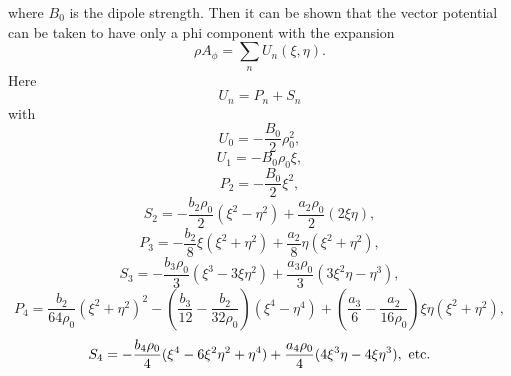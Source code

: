 \noindent where $B_0$ is the dipole strength.  Then it can be shown that the vector potential can be taken to have only a phi component with the expansion
\begin{equation}
\rho A_{\phi} = \sum_n U_n(\xi ,\eta ).
\end{equation}
Here
\begin{equation}
U_n = P_n + S_n
\end{equation}
with
\begin{equation}
U_0 = -\frac{B_0}{2} \rho^2_0,
\end{equation}
\begin{equation}
U_1 = -B_0\rho_0\xi ,
\end{equation}
\begin{equation}
P_2 = -\frac{B_0}{2} \xi^2 ,
\end{equation}
\begin{equation}
S_2 = -\frac{b_2\rho_0}{2}  (\xi^2 - \eta^2) + \frac{a_2\rho_0}{2} (2\xi \eta ),
\end{equation}
\begin{equation}
P_3 = -\frac{b_2}{8} \xi  (\xi^2 + \eta^2) + \frac{a_2}{8} \eta (\xi^2 + \eta^2),
\end{equation}
\begin{equation}
S_3 = -\frac{b_3\rho_0}{3}  (\xi^3 - 3\xi \eta^2) + \frac{a_3\rho_0}{3} (3\xi^2 \eta - \eta^3),
\end{equation}
\begin{equation}
P_4 = \frac{b_2}{64\rho_0}  (\xi^2 + \eta^2)^2 - \left( \frac{b_3}{12} - \frac{b_2}{32\rho_0}\right) (\xi^4 -\eta^4) + \left( \frac{a_3}{6} - \frac{a_2}{16\rho_0}\right) \xi \eta (\xi^2 + \eta^2),
\end{equation}
\begin{equation}
S_4 = -\frac{b_4\rho_0}{4}  (\xi^4 - 6\xi^2\eta^2 + \eta^4) + \frac{a_4\rho_0}{4} (4\xi^3\eta - 4\xi \eta^3), \ {\rm etc.}
\end{equation}


